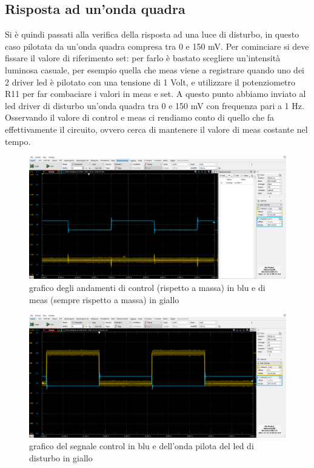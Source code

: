 \documentclass[10pt, a4paper, italian]{article}
\begin{document}
\subsection{Risposta ad un'onda quadra}
Si è quindi passati alla verifica della risposta ad una luce di disturbo, in questo caso pilotata da un'onda quadra compresa tra 0 e 150 mV.
Per cominciare si deve fissare il valore di riferimento set: per farlo è bastato scegliere un'intensità luminosa casuale, per esempio quella che meas viene a registrare quando uno dei 2 driver led è pilotato con una tensione di 1 Volt, e utilizzare il potenziometro R11 per far combaciare i valori in meas e set.
A questo punto abbiamo inviato al led driver di disturbo un'onda quadra tra 0 e 150 mV con frequenza pari a 1 Hz.
Osservando il valore di control e meas ci rendiamo conto di quello che fa effettivamente il circuito, ovvero cerca di mantenere il valore di meas costante nel tempo.
\begin{figure}[H]
    \centering
	\includegraphics[scale=0.7]{control7.meas}
    \caption{grafico degli andamenti di control (rispetto a massa) in blu e di meas (sempre rispetto a massa) in giallo
    \label{fig: Draft1}}
\end{figure}
\begin{figure}[H]
    \centering
	\includegraphics[scale=0.7]{control7}
    \caption{grafico del segnale control in blu e dell'onda pilota del led di disturbo in giallo
    \label{fig: Draft1}}
\end{figure}
\end{document}
